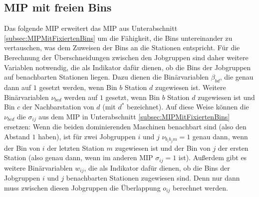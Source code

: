 \documentclass{scrreprt}
\begin{document}
\subsection{MIP mit freien Bins}
\label{subsec:MIPMitFreienBins}
Das folgende MIP erweitert das MIP aus Unterabschnitt \ref{subsec:MIPMitFixiertenBins} um die Fähigkeit, die Bins untereinander zu vertauschen,
was dem Zuweisen der Bins an die Stationen entspricht.
Für die Berechnung der Überschneidungen zwischen den Jobgruppen sind daher weitere Variablen notwendig, die als Indikator dafür dienen,
ob die Bins der Jobgruppen auf benachbarten Stationen liegen.
Dazu dienen die Binärvariablen $\beta_{bd}$, die genau dann auf $1$ gesetzt werden, wenn Bin $b$ Station $d$ zugewiesen ist.
Weitere Binärvariablen $\nu_{bcd}$ werden auf $1$ gesetzt, wenn Bin $b$ Station $d$ zugewiesen ist und Bin $c$ der Nachbarstation von $d$ (mit $d^*$ bezeichnet).
Auf diese Weise können die $\nu_{bcd}$ die $\sigma_{ij}$ aus dem MIP in Unterabschnitt \ref{subsec:MIPMitFixiertenBins} ersetzen:
Wenn die beiden dominierenden Maschinen benachbart sind (also den Abstand $1$ haben), ist für zwei Jobgruppen $i$ und $j$ $\nu_{b_ib_jm}=1$ genau dann, 
wenn der Bin von $i$ der letzten Station $m$ zugewiesen ist und der Bin von $j$ der ersten Station (also genau dann, wenn im anderen MIP $\sigma_{ij}=1$ ist).
Außerdem gibt es weitere Binärvariablen $w_{ij}$, die als Indikator dafür dienen, ob die Bins der Jobgruppen $i$ und $j$ benachbarten Stationen zugewiesen sind.
Denn nur dann muss zwischen diesen Jobgruppen die Überlappung $o_{ij}$ berechnet werden.
\end{document}
